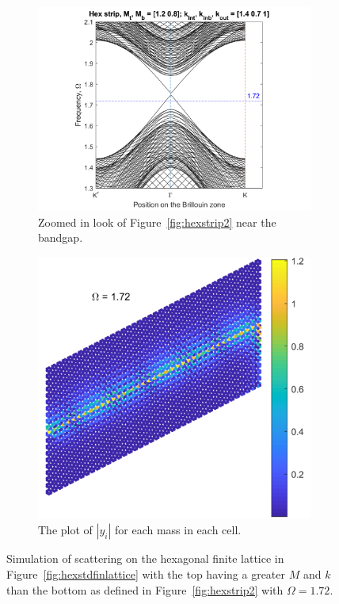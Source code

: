 \begin{figure}
\centering
\begin{subfigure}[b]{.5\textwidth}
  \centering
  \includegraphics[width=1.1\linewidth]{imgs/hexstripperturb2zoom.png}
  \caption{Zoomed in look of Figure~\ref{fig:hexstrip2} near the bandgap.}
  \label{fig:sub1}
\end{subfigure}%
\begin{subfigure}[b]{.5\textwidth}
  \centering
  \includegraphics[width=1\linewidth]{imgs/hexstdMk.png}
  \caption{The plot of $|y_i|$ for each mass in each cell.}
  \label{fig:sub2}
\end{subfigure}
\caption{Simulation of scattering on the hexagonal finite lattice in
  Figure~\ref{fig:hexstdfinlattice} with the top having a greater $M$ and $k$
  than the bottom as defined in Figure~\ref{fig:hexstrip2} with $\Omega =
  1.72$.}
\label{fig:hexstdMk}
\end{figure}

